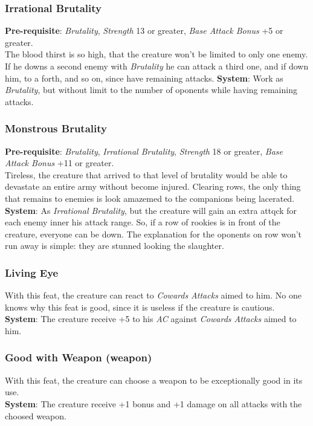 \documentclass[ letterpaper,12pt]{article}
\begin{document}
\subsubsection{Irrational Brutality}
{\bf Pre-requisite}: {\it Brutality}, {\it Strength} 13 or greater, {\it Base Attack Bonus} +5 or greater.\\
The blood thirst is so high, that the creature won't be limited to only one enemy. If he downs a second enemy with {\it Brutality} he can attack a third one, and if down him, to a forth, and so on, since have remaining attacks.
{\bf System}: Work as {\it Brutality}, but without limit to the number of oponents while having remaining attacks.

\subsubsection{Monstrous Brutality}
{\bf Pre-requisite}: {\it Brutality}, {\it Irrational Brutality}, {\it Strength} 18 or greater, {\it Base Attack Bonus} +11 or greater.\\
Tireless, the creature that arrived to that level of brutality would be able to devastate an entire army without become injured. Clearing rows, the only thing that remains to enemies is look amazemed to the companions being lacerated. \\
{\bf System}: As {\it Irrational Brutality}, but the creature will gain an extra attqck for each enemy inner his attack range. So, if a row of rookies is in front of the creature, everyone can be down. The explanation for the oponents on row won't run away is simple: they are stunned looking the slaughter.

\subsubsection{Living Eye}
With this feat, the creature can react to {\it Cowards Attacks} aimed to him. No one knows why this feat is good, since it is useless if the creature is cautious.\\
{\bf System}: The creature receive +5 to his {\it AC} against {\it Cowards Attacks} aimed to him.

\subsubsection{Good with Weapon (weapon)}
With this feat, the creature can choose a weapon to be exceptionally good in its use.\\
{\bf System}: The creature receive +1 bonus and +1 damage on all attacks with the choosed weapon.
\end{document}
